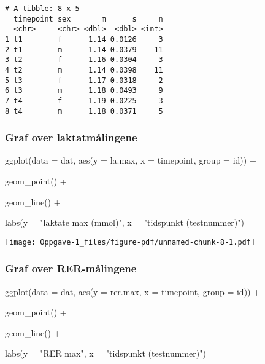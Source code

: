 \documentclass[
  letterpaper,
  DIV=11,
  numbers=noendperiod]{scrreprt}
\newenvironment{Shaded}{\begin{snugshade}}{\end{snugshade}}
\newcommand{\AttributeTok}[1]{\textcolor[rgb]{0.40,0.45,0.13}{#1}}
\newcommand{\FunctionTok}[1]{\textcolor[rgb]{0.28,0.35,0.67}{#1}}
\newcommand{\NormalTok}[1]{\textcolor[rgb]{0.00,0.23,0.31}{#1}}
\newcommand{\SpecialCharTok}[1]{\textcolor[rgb]{0.37,0.37,0.37}{#1}}
\newcommand{\StringTok}[1]{\textcolor[rgb]{0.13,0.47,0.30}{#1}}
\begin{document}
\begin{verbatim}
# A tibble: 8 x 5
  timepoint sex       m      s     n
  <chr>     <chr> <dbl>  <dbl> <int>
1 t1        f      1.14 0.0126     3
2 t1        m      1.14 0.0379    11
3 t2        f      1.16 0.0304     3
4 t2        m      1.14 0.0398    11
5 t3        f      1.17 0.0318     2
6 t3        m      1.18 0.0493     9
7 t4        f      1.19 0.0225     3
8 t4        m      1.18 0.0371     5
\end{verbatim}

\subsubsection{Graf over
laktatmålingene}\label{graf-over-laktatmuxe5lingene}

\begin{Shaded}
\begin{Highlighting}[]
\FunctionTok{ggplot}\NormalTok{(}\AttributeTok{data =}\NormalTok{ dat,}
       \FunctionTok{aes}\NormalTok{(}\AttributeTok{y =}\NormalTok{ la.max,}
           \AttributeTok{x =}\NormalTok{ timepoint,}
           \AttributeTok{group =}\NormalTok{ id)) }\SpecialCharTok{+}
  
  \FunctionTok{geom\_point}\NormalTok{() }\SpecialCharTok{+}
  
  \FunctionTok{geom\_line}\NormalTok{() }\SpecialCharTok{+} 
  
  \FunctionTok{labs}\NormalTok{(}\AttributeTok{y =} \StringTok{"laktate max (mmol)"}\NormalTok{,}
       \AttributeTok{x =} \StringTok{"tidspunkt (testnummer)"}\NormalTok{)}
\end{Highlighting}
\end{Shaded}

\texttt{[image: Oppgave-1\_files/figure-pdf/unnamed-chunk-8-1.pdf]}

\subsubsection{Graf over
RER-målingene}\label{graf-over-rer-muxe5lingene}

\begin{Shaded}
\begin{Highlighting}[]
\FunctionTok{ggplot}\NormalTok{(}\AttributeTok{data =}\NormalTok{ dat,}
       \FunctionTok{aes}\NormalTok{(}\AttributeTok{y =}\NormalTok{ rer.max,}
           \AttributeTok{x =}\NormalTok{ timepoint,}
           \AttributeTok{group =}\NormalTok{ id)) }\SpecialCharTok{+}
  
  \FunctionTok{geom\_point}\NormalTok{() }\SpecialCharTok{+}
  
  \FunctionTok{geom\_line}\NormalTok{() }\SpecialCharTok{+} 
  
  \FunctionTok{labs}\NormalTok{(}\AttributeTok{y =} \StringTok{"RER max"}\NormalTok{,}
       \AttributeTok{x =} \StringTok{"tidspunkt (testnummer)"}\NormalTok{)}
\end{Highlighting}
\end{Shaded}
\end{document}
